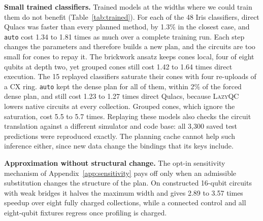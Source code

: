 \textbf{Small trained classifiers.} Trained models at the widths where we could train them do not benefit (Table~\ref{tab:trained}). For each of the 48 Iris classifiers, direct Qulacs was faster than every planned method, by 1.3\% in the closest case, and \texttt{auto} cost 1.34 to 1.81 times as much over a complete training run. Each step changes the parameters and therefore builds a new plan, and the circuits are too small for cones to repay it. The brickwork ansatz keeps cones local, four of eight qubits at depth two, yet grouped cones still cost 1.42 to 1.64 times direct execution. The 15 replayed classifiers saturate their cones with four re-uploads of a CX ring. \texttt{auto} kept the dense plan for all of them, within 2\% of the forced dense plan, and still cost 1.23 to 1.27 times direct Qulacs, because \textsc{LazyQC} lowers native circuits at every collection. Grouped cones, which ignore the saturation, cost 5.5 to 5.7 times. Replaying these models also checks the circuit translation against a different simulator and code base: all 3,300 saved test predictions were reproduced exactly. The planning cache cannot help such inference either, since new data change the bindings that its keys include.

\textbf{Approximation without structural change.} The opt-in sensitivity mechanism of Appendix~\ref{app:sensitivity} pays off only when an admissible substitution changes the structure of the plan. On constructed 16-qubit circuits with weak bridges it halves the maximum width and gives 2.89 to 3.57 times speedup over eight fully charged collections, while a connected control and all eight-qubit fixtures regress once profiling is charged.
